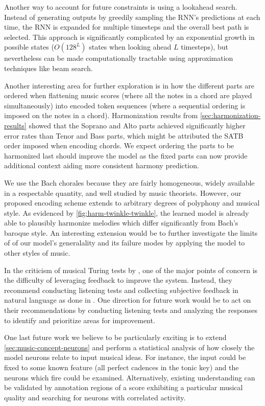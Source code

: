 Another way to account for future constraints is using a lookahead
search. Instead of generating outputs by greedily sampling the RNN's
predictions at each time, the RNN is expanded for multiple timesteps and
the overall best path is selected. This approach is significantly
complicated by an exponential growth in possible states ($O(128^L)$
states when looking ahead $L$ timesteps), but nevertheless can be made
computationally tractable using approximation techniques like
beam search\citep{norvig1992paradigms}.

Another interesting area for further exploration is in how the different parts
are ordered when flattening music scores (where all the notes in a chord are
played simultaneously) into encoded token sequences (where a sequential
ordering is imposed on the notes in a chord). Harmonization results from
\vref{sec:harmonization-results} showed that the Soprano and Alto parts
achieved significantly higher error rates than Tenor and Bass parts, which
might be attributed the SATB order imposed when encoding chords. We expect
ordering the parts to be harmonized last should improve the model as the fixed
parts can now provide additional context aiding more consistent harmony
prediction.

We use the Bach chorales because they are fairly homogeneous, widely available
in a respectable quantity, and well studied by music theorists. However, our
proposed encoding scheme extends to arbitrary degrees of polyphony and musical
style. As evidenced by \vref{fig:harm-twinkle-twinkle}, the learned model is
already able to plausibly harmonize melodies which differ significantly from
Bach's baroque style. An interesting extension would be to further investigate
the limits of of our model's generalality and its failure modes by applying
the model to other styles of music.

In the criticism of musical Turing tests by \citet{ariza2009interrogator}, one
of the major points of concern is the difficulty of leveraging feedback to
improve the system. Instead, they recommend conducting listening tests and
collecting subjective feedback in natural language as done in
\citet{collins2016developing}. One direction for future work would be to
act on their recommendations by conducting listening tests and analyzing
the responses to identify and prioritize areas for improvement.

One last future work we believe to be particularly exciting is to extend
\vref{sec:music-concept-neurons} and perform a statistical analysis of how
closely the model neurons relate to input musical ideas. For instance, the
input could be fixed to some known feature (\eg all perfect cadences in the
tonic key) and the neurons which fire could be examined. Alternatively,
existing understanding can be validated by annotation regions of a score
exhibiting a particular musical quality and searching for neurons with
correlated activity.

